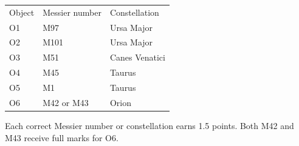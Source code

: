 \begin{center}\begin{tabular}{lll}
Object & Messier number & Constellation\\
O1 & M97 & Ursa Major\\
O2 & M101 & Ursa Major\\
O3 & M51 & Canes Venatici\\
O4 & M45 & Taurus\\
O5 & M1 & Taurus\\
O6 & M42 or M43 & Orion
\end{tabular}\end{center}
Each correct Messier number or constellation earns 1.5 points. Both M42 and M43 receive full marks for O6.
